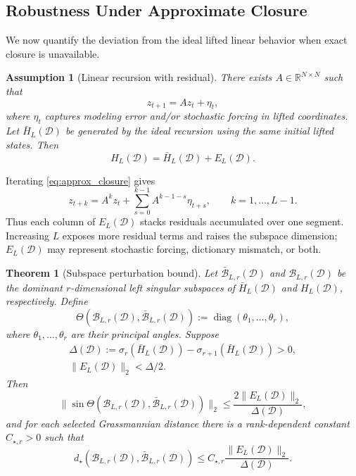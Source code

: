 \documentclass[letterpaper, 10 pt, conference]{ieeeconf}  %
\DeclareMathOperator*{\diag}{diag}
\newtheorem{theorem}{Theorem}
\newtheorem{assumption}{Assumption}
\newcommand{\R}{\mathbb{R}}
\begin{document}
\subsection{Robustness Under Approximate Closure}
\label{sec:robustness}

We now quantify the deviation from the ideal lifted linear behavior when exact closure is unavailable.

\begin{assumption}[Linear recursion with residual]
\label{ass:approx_closure}
There exists $A\in\R^{N\times N}$ such that
\begin{equation}
  z_{t+1}=Az_t+\eta_t,
  \label{eq:approx_closure}
\end{equation}
where $\eta_t$ captures modeling error and/or stochastic forcing in lifted coordinates. Let $\bar H_L(\mathcal D)$ be generated by the ideal recursion using the same initial lifted states. Then
\[
  H_L(\mathcal D)=\bar H_L(\mathcal D)+E_L(\mathcal D).
\]
\end{assumption}

Iterating \eqref{eq:approx_closure} gives
\begin{equation}
  z_{t+k}=A^kz_t+\sum_{s=0}^{k-1}A^{k-1-s}\eta_{t+s},
  \qquad k=1,\ldots,L-1.
  \label{eq:residual_accumulation}
\end{equation}
Thus each column of $E_L(\mathcal D)$ stacks residuals accumulated over one segment. Increasing $L$ exposes more residual terms and raises the subspace dimension; $E_L(\mathcal D)$ may represent stochastic forcing, dictionary mismatch, or both.

\begin{theorem}[Subspace perturbation bound]
\label{thm:robustness}
Let $\bar{\mathcal B}_{L,r}(\mathcal D)$ and $\mathcal B_{L,r}(\mathcal D)$ be the dominant $r$-dimensional left singular subspaces of $\bar H_L(\mathcal D)$ and $H_L(\mathcal D)$, respectively. Define
\[
  \Theta\!\left(\mathcal B_{L,r}(\mathcal D),\bar{\mathcal B}_{L,r}(\mathcal D)\right):=\diag(\theta_1,\ldots,\theta_r),
\]
where $\theta_1,\ldots,\theta_r$ are their principal angles. Suppose
\begin{equation}
    \begin{aligned}
          \Delta(\mathcal D):=\sigma_r(\bar H_L(\mathcal D))-\sigma_{r+1}(\bar H_L(\mathcal D))>0,\\
          \|E_L(\mathcal D)\|_2<\Delta/2.
    \end{aligned}
    \label{eq:robustness_gap_condition}
\end{equation}
Then
\begin{equation}
  \|\sin\Theta(\mathcal B_{L,r}(\mathcal D),\bar{\mathcal B}_{L,r}(\mathcal D))\|_2
  \leq \frac{2\|E_L(\mathcal D)\|_2}{\Delta(\mathcal D)},
  \label{eq:sin_theta_robustness}
\end{equation}
and for each selected Grassmannian distance there is a rank-dependent constant $C_{\star,r}>0$ such that
\begin{equation}
  d_\star(\mathcal B_{L,r}(\mathcal D),\bar{\mathcal B}_{L,r}(\mathcal D))
  \leq C_{\star,r}\frac{\|E_L(\mathcal D)\|_2}{\Delta(\mathcal D)}.
  \label{eq:distance_robustness}
\end{equation}
\end{theorem}
\end{document}
